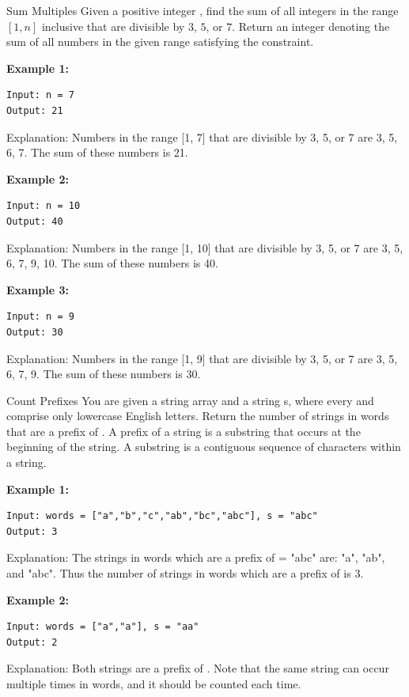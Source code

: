 \documentclass[twoside]{article}
\begin{document}
\begin{task}{Sum Multiples}{}{}
Given a positive integer , find the sum of all integers in the range $[1, n]$ inclusive that are divisible by $3$, $5$, or $7$.
Return an integer denoting the sum of all numbers in the given range satisfying the constraint.
\vspace{10pt}

\textbf{Example 1:}
\begin{lstlisting}[numbers=none]
Input: n = 7
Output: 21
\end{lstlisting}
Explanation: Numbers in the range [1, 7] that are divisible by 3, 5, or 7 are 3, 5, 6, 7. The sum of these numbers is 21.
\vspace{10pt}

\textbf{Example 2:}
\begin{lstlisting}[numbers=none]
Input: n = 10
Output: 40
\end{lstlisting}
Explanation: Numbers in the range [1, 10] that are divisible by 3, 5, or 7 are 3, 5, 6, 7, 9, 10. The sum of these numbers is 40.
\vspace{10pt}

\textbf{Example 3:}

\begin{lstlisting}[numbers=none]
Input: n = 9
Output: 30
\end{lstlisting}
Explanation: Numbers in the range [1, 9] that are divisible by 3, 5, or 7 are 3, 5, 6, 7, 9. The sum of these numbers is 30.

\end{task}



\begin{task}{Count Prefixes}{}{}
You are given a string array  and a string s, where every  and  comprise only lowercase English letters.
Return the number of strings in words that are a prefix of .
A prefix of a string is a substring that occurs at the beginning of the string. 
A substring is a contiguous sequence of characters within a string.

 \vspace{10pt}

\textbf{Example 1:}

\begin{lstlisting}[numbers=none]
Input: words = ["a","b","c","ab","bc","abc"], s = "abc"
Output: 3
\end{lstlisting}
Explanation: The strings in words which are a prefix of  = "abc" are:
"a", "ab", and "abc".
Thus the number of strings in words which are a prefix of  is 3.
\vspace{10pt}

\textbf{Example 2:}
\begin{lstlisting}[numbers=none]
Input: words = ["a","a"], s = "aa"
Output: 2
\end{lstlisting}
Explanation: Both strings are a prefix of . 
Note that the same string can occur multiple times in words, and it should be counted each time.

\end{task}
\end{document}
